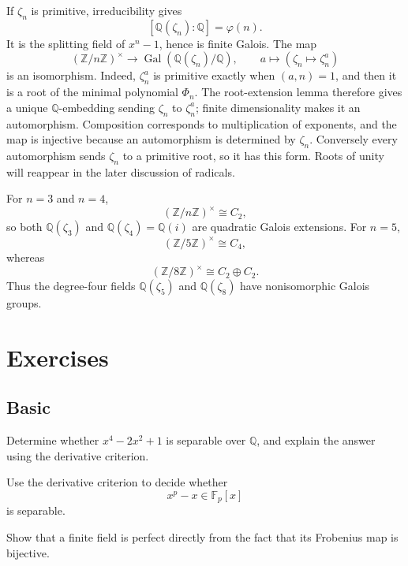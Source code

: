 If \(\zeta_n\) is primitive, irreducibility gives
\[
[\mathbb Q(\zeta_n):\mathbb Q]=\varphi(n).
\]
It is the splitting field of \(x^n-1\), hence is finite Galois.  The map
\[
(\mathbb Z/n\mathbb Z)^\times\longrightarrow
\operatorname{Gal}(\mathbb Q(\zeta_n)/\mathbb Q),
\qquad a\longmapsto(\zeta_n\mapsto\zeta_n^a)
\]
is an isomorphism.  Indeed, \(\zeta_n^a\) is primitive exactly when
\((a,n)=1\), and then it is a root of the minimal polynomial \(\Phi_n\).
The root-extension lemma therefore gives a unique \(\mathbb Q\)-embedding
sending \(\zeta_n\) to \(\zeta_n^a\); finite dimensionality makes it an
automorphism.  Composition corresponds to multiplication of exponents, and
the map is injective because an automorphism is determined by \(\zeta_n\).
Conversely every automorphism sends \(\zeta_n\) to a primitive root, so it
has this form.  Roots of unity will reappear in the later discussion of
radicals.

\begin{example}
For \(n=3\) and \(n=4\),
\[
(\mathbb Z/n\mathbb Z)^\times\cong C_2,
\]
so both \(\mathbb Q(\zeta_3)\) and
\(\mathbb Q(\zeta_4)=\mathbb Q(i)\) are quadratic Galois extensions.  For
\(n=5\),
\[
(\mathbb Z/5\mathbb Z)^\times\cong C_4,
\]
whereas
\[
(\mathbb Z/8\mathbb Z)^\times\cong C_2\oplus C_2.
\]
Thus the degree-four fields \(\mathbb Q(\zeta_5)\) and
\(\mathbb Q(\zeta_8)\) have nonisomorphic Galois groups.
\end{example}

\section*{Exercises}
\subsection*{Basic}
\begin{exercise}[Basic] Determine whether \(x^4-2x^2+1\) is separable over
\(\mathbb Q\), and explain the answer using the derivative criterion.
\end{exercise}
\begin{exercise}[Basic] Use the derivative criterion to decide whether
\[
x^p-x\in\mathbb F_p[x]
\]
is separable.
\end{exercise}
\begin{exercise}[Basic] Show that a finite field is perfect directly from
the fact that its Frobenius map is bijective.
\end{exercise}

